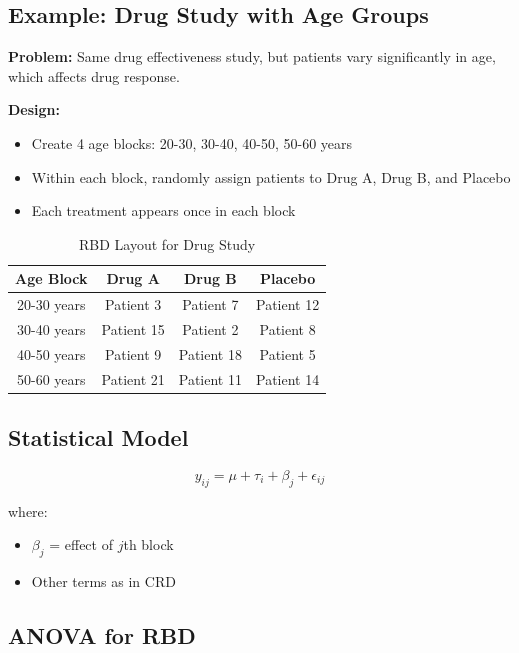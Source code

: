 \documentclass[twoside]{book}
\begin{document}
\subsection{Example: Drug Study with Age Groups}

\textbf{Problem:} Same drug effectiveness study, but patients vary significantly in age, which affects drug response.

\textbf{Design:}
\begin{itemize}
    \item Create 4 age blocks: 20-30, 30-40, 40-50, 50-60 years
    \item Within each block, randomly assign patients to Drug A, Drug B, and Placebo
    \item Each treatment appears once in each block
\end{itemize}

\begin{table}[H]
\centering
\caption{RBD Layout for Drug Study}
\begin{tabular}{|c|c|c|c|}
\hline
\textbf{Age Block} & \textbf{Drug A} & \textbf{Drug B} & \textbf{Placebo} \\
\hline
20-30 years & Patient 3 & Patient 7 & Patient 12 \\
30-40 years & Patient 15 & Patient 2 & Patient 8 \\
40-50 years & Patient 9 & Patient 18 & Patient 5 \\
50-60 years & Patient 21 & Patient 11 & Patient 14 \\
\hline
\end{tabular}
\end{table}

\subsection{Statistical Model}

\begin{equation}
y_{ij} = \mu + \tau_i + \beta_j + \epsilon_{ij}
\end{equation}

where:
\begin{itemize}
    \item $\beta_j$ = effect of $j$th block
    \item Other terms as in CRD
\end{itemize}

\subsection{ANOVA for RBD}
\end{document}

